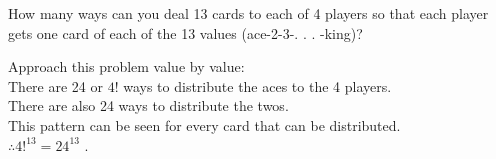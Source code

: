 \question How many ways can you deal 13 cards to each of 4 players 
so that each player gets one card of each of the 13 values 
(ace-2-3-. . . -king)? 
\begin{solution}[2 cm]
Approach this problem value by value: \\ 
There are 24 or $4!$ ways to distribute the aces to the 4 players. \\
There are also 24 ways to distribute the twos. \\
This pattern can be seen for every card that can be distributed. \\
$\therefore 4!^{13} = 24^{13}$ .
\end{solution}
